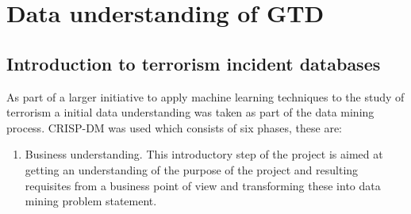 \chapter[A Preliminary understanding of the global terrorism database]{Data understanding of GTD}

\section{Introduction to terrorism incident databases}
As part of a larger initiative to apply machine learning techniques to the study of terrorism a initial data understanding was taken as part of the data mining process.  CRISP-DM \citep{chapman2000crisp} was used which consists of six phases, these are:

\begin{enumerate}
\item Business understanding. This introductory step of the project is aimed at getting an understanding of the purpose of the project and resulting requisites from a business point of view and transforming these into data mining problem statement. 


\end{enumerate}

